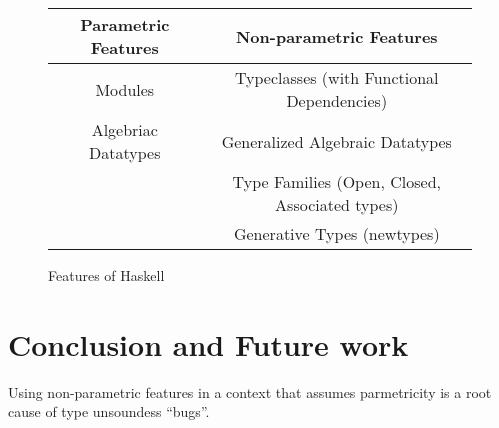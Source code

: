 \documentclass[manuscript,screen,nonacm]{acmart}
\begin{document}
\begin{figure}[ht]
  \centering
  \begin{tabular}[ht]{c | c}
    Parametric Features & Non-parametric Features \\
    \hline
    Modules             & Typeclasses (with Functional Dependencies)\\
    Algebriac Datatypes & Generalized Algebraic Datatypes\\
                        & Type Families (Open, Closed, Associated types)\\
                        & Generative Types (newtypes)
  \end{tabular}
  \caption{Features of Haskell}
  \label{fig:haskell-lang-features}
\end{figure}

\section{Conclusion and Future work}\label{sec:conclusion}
Using non-parametric features in a context that assumes parmetricity is a root cause of type unsoundess ``bugs''.


\newpage

\end{document}
